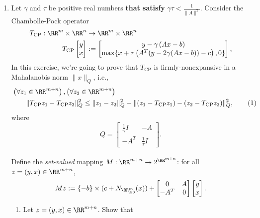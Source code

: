 \documentclass[11pt]{article}
\newcommand\numberthis{\addtocounter{equation}{1}\tag{\theequation}}
\begin{document}
\newcommand{\Tcp}{T_{\mathrm{CP}}}
\newcommand{\Fix}{\mathrm{Fix}}

\begin{enumerate}

\item Let $\gamma$ and $\tau$ be positive real numbers \textbf{that satisfy} $\gamma \tau < \frac{1}{\|A\|^2}$. Consider the Chambolle-Pock operator
\begin{align*}
T_{\mathrm{CP}} : \RR^m \times \RR^n &\rightarrow \RR^m \times \RR^n\\
T_{\mathrm{CP}} \begin{bmatrix} 
y \\ 
x
\end{bmatrix} &:= 
\begin{bmatrix} 
y - \gamma  \left(Ax - b\right) \\
\max\{ x + \tau \left(A^T(y - 2\gamma(Ax - b)) - c\right), 0\}
\end{bmatrix},
\end{align*}
In this exercise, we're going to prove that $\Tcp$ is firmly-nonexpansive in a Mahalanobis norm $\|x\|_Q$, i.e., 
\begin{align*}
&\left(\forall z_1 \in \RR^{m+n}\right), \left(\forall z_2 \in \RR^{m+n}\right) \\
&\hspace{20pt}\|\Tcp z_1 - \Tcp z_2\|_Q^2 \leq \|z_1 - z_2\|_Q^2 - \|(z_1 - \Tcp z_1) - (z_2 - \Tcp z_2)\|_Q^2, \numberthis\label{eq:firmnonexpansive}
\end{align*}
where 
$$
Q = \begin{bmatrix}
\frac{1}{\gamma} I  &  - A \\
- A^T & \frac{1}{\tau} I 
\end{bmatrix}.
$$
~\\
Define the \textit{set-valued} mapping $M : \RR^{m+n} \rightarrow 2^{\RR^{m + n}}$: for all $z = (y, x) \in \RR^{m+n}$,
\begin{align*}
Mz := \{-b\} \times (c + N_{\RR^m_{\geq 0}}(x)) + \begin{bmatrix} 
0 & A \\
-A^T & 0 
\end{bmatrix}\begin{bmatrix} 
y \\
x
\end{bmatrix}.
\end{align*}
\begin{enumerate}
\item \label{item:a}Let $z =  (y,x) \in \RR^{m + n}$. Show that

\end{enumerate}
\end{enumerate}
\end{document}
